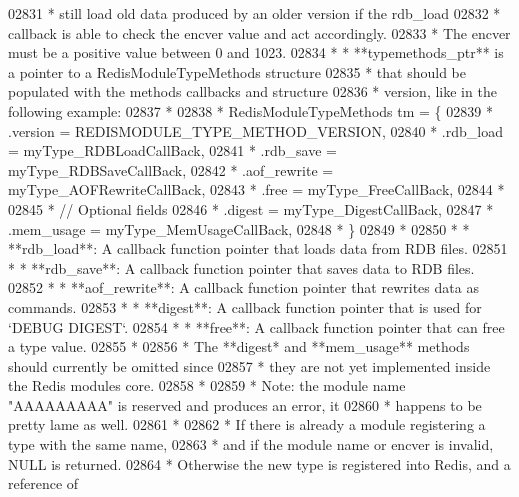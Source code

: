 \begin{DoxyCode}
{{{02831 \textcolor{comment}{ *   still load old data produced by an older version if the rdb\_load}
02832 \textcolor{comment}{ *   callback is able to check the encver value and act accordingly.}
02833 \textcolor{comment}{ *   The encver must be a positive value between 0 and 1023.}
02834 \textcolor{comment}{ * * **typemethods\_ptr** is a pointer to a RedisModuleTypeMethods structure}
02835 \textcolor{comment}{ *   that should be populated with the methods callbacks and structure}
02836 \textcolor{comment}{ *   version, like in the following example:}
02837 \textcolor{comment}{ *}
02838 \textcolor{comment}{ *      RedisModuleTypeMethods tm = \{}
02839 \textcolor{comment}{ *          .version = REDISMODULE\_TYPE\_METHOD\_VERSION,}
02840 \textcolor{comment}{ *          .rdb\_load = myType\_RDBLoadCallBack,}
02841 \textcolor{comment}{ *          .rdb\_save = myType\_RDBSaveCallBack,}
02842 \textcolor{comment}{ *          .aof\_rewrite = myType\_AOFRewriteCallBack,}
02843 \textcolor{comment}{ *          .free = myType\_FreeCallBack,}
02844 \textcolor{comment}{ *}
02845 \textcolor{comment}{ *          // Optional fields}
02846 \textcolor{comment}{ *          .digest = myType\_DigestCallBack,}
02847 \textcolor{comment}{ *          .mem\_usage = myType\_MemUsageCallBack,}
02848 \textcolor{comment}{ *      \}}
02849 \textcolor{comment}{ *}
02850 \textcolor{comment}{ * * **rdb\_load**: A callback function pointer that loads data from RDB files.}
02851 \textcolor{comment}{ * * **rdb\_save**: A callback function pointer that saves data to RDB files.}
02852 \textcolor{comment}{ * * **aof\_rewrite**: A callback function pointer that rewrites data as commands.}
02853 \textcolor{comment}{ * * **digest**: A callback function pointer that is used for `DEBUG DIGEST`.}
02854 \textcolor{comment}{ * * **free**: A callback function pointer that can free a type value.}
02855 \textcolor{comment}{ *}
02856 \textcolor{comment}{ * The **digest* and **mem\_usage** methods should currently be omitted since}
02857 \textcolor{comment}{ * they are not yet implemented inside the Redis modules core.}
02858 \textcolor{comment}{ *}
02859 \textcolor{comment}{ * Note: the module name "AAAAAAAAA" is reserved and produces an error, it}
02860 \textcolor{comment}{ * happens to be pretty lame as well.}
02861 \textcolor{comment}{ *}
02862 \textcolor{comment}{ * If there is already a module registering a type with the same name,}
02863 \textcolor{comment}{ * and if the module name or encver is invalid, NULL is returned.}
02864 \textcolor{comment}{ * Otherwise the new type is registered into Redis, and a reference of}
}}}
\end{DoxyCode}
